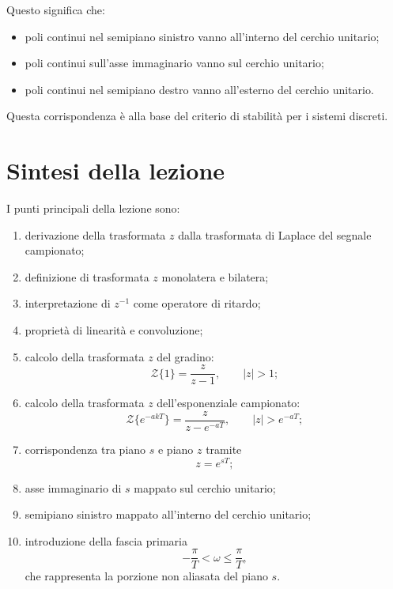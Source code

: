 Questo significa che:
\begin{itemize}
    \item poli continui nel semipiano sinistro vanno all'interno del cerchio unitario;
    \item poli continui sull'asse immaginario vanno sul cerchio unitario;
    \item poli continui nel semipiano destro vanno all'esterno del cerchio unitario.
\end{itemize}

Questa corrispondenza è alla base del criterio di stabilità per i sistemi discreti.

\section{Sintesi della lezione}

I punti principali della lezione sono:
\begin{enumerate}
    \item derivazione della trasformata \(z\) dalla trasformata di Laplace del segnale campionato;
    \item definizione di trasformata \(z\) monolatera e bilatera;
    \item interpretazione di \(z^{-1}\) come operatore di ritardo;
    \item proprietà di linearità e convoluzione;
    \item calcolo della trasformata \(z\) del gradino:
    \[
    \mathcal{Z}\{1\}=\frac{z}{z-1},\qquad |z|>1;
    \]
    \item calcolo della trasformata \(z\) dell'esponenziale campionato:
    \[
    \mathcal{Z}\{e^{-akT}\}=\frac{z}{z-e^{-aT}},\qquad |z|>e^{-aT};
    \]
    \item corrispondenza tra piano \(s\) e piano \(z\) tramite
    \[
    z=e^{sT};
    \]
    \item asse immaginario di \(s\) mappato sul cerchio unitario;
    \item semipiano sinistro mappato all'interno del cerchio unitario;
    \item introduzione della fascia primaria
    \[
    -\frac{\pi}{T}<\omega\le \frac{\pi}{T},
    \]
    che rappresenta la porzione non aliasata del piano \(s\).
\end{enumerate}